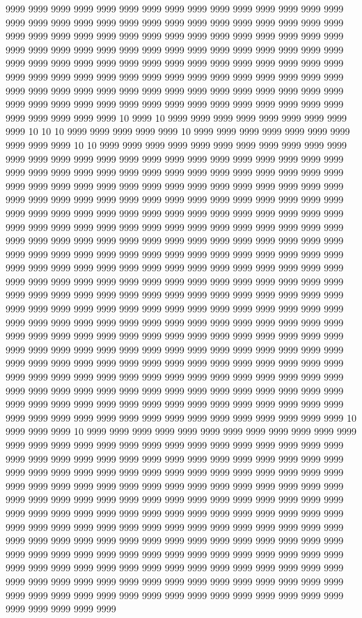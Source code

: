 9999 9999 9999 9999 9999 9999 9999 9999 9999 9999 9999 9999 9999 9999 9999 9999 9999 9999 9999 9999 9999 9999 9999 9999 9999 9999 9999 9999 9999 9999 9999 9999 9999 9999 9999 9999 9999 9999 9999 9999 9999 9999 9999 9999 9999 9999 9999 9999 9999 9999 9999 9999 9999 9999 9999 9999 9999 9999 9999 9999 9999 9999 9999 9999 9999 9999 9999 9999 9999 9999 9999 9999 9999 9999 9999 9999 9999 9999 9999 9999 9999 9999 9999 9999 9999 9999 9999 9999 9999 9999 9999 9999 9999 9999 9999 9999 9999 9999 9999 9999 9999 9999 9999 9999 9999 9999 9999 9999 9999 9999 9999 9999 9999 9999 9999 9999 9999 9999 9999 9999 9999 9999 9999 9999 9999 10 9999 10 9999 9999 9999 9999 9999 9999 9999 9999 9999 10 10 10 9999 9999 9999 9999 9999 10 9999 9999 9999 9999 9999 9999 9999 9999 9999 9999 10 10 9999 9999 9999 9999 9999 9999 9999 9999 9999 9999 9999 9999 9999 9999 9999 9999 9999 9999 9999 9999 9999 9999 9999 9999 9999 9999 9999 9999 9999 9999 9999 9999 9999 9999 9999 9999 9999 9999 9999 9999 9999 9999 9999 9999 9999 9999 9999 9999 9999 9999 9999 9999 9999 9999 9999 9999 9999 9999 9999 9999 9999 9999 9999 9999 9999 9999 9999 9999 9999 9999 9999 9999 9999 9999 9999 9999 9999 9999 9999 9999 9999 9999 9999 9999 9999 9999 9999 9999 9999 9999 9999 9999 9999 9999 9999 9999 9999 9999 9999 9999 9999 9999 9999 9999 9999 9999 9999 9999 9999 9999 9999 9999 9999 9999 9999 9999 9999 9999 9999 9999 9999 9999 9999 9999 9999 9999 9999 9999 9999 9999 9999 9999 9999 9999 9999 9999 9999 9999 9999 9999 9999 9999 9999 9999 9999 9999 9999 9999 9999 9999 9999 9999 9999 9999 9999 9999 9999 9999 9999 9999 9999 9999 9999 9999 9999 9999 9999 9999 9999 9999 9999 9999 9999 9999 9999 9999 9999 9999 9999 9999 9999 9999 9999 9999 9999 9999 9999 9999 9999 9999 9999 9999 9999 9999 9999 9999 9999 9999 9999 9999 9999 9999 9999 9999 9999 9999 9999 9999 9999 9999 9999 9999 9999 9999 9999 9999 9999 9999 9999 9999 9999 9999 9999 9999 9999 9999 9999 9999 9999 9999 9999 9999 9999 9999 9999 9999 9999 9999 9999 9999 9999 9999 9999 9999 9999 9999 9999 9999 9999 9999 9999 9999 9999 9999 9999 9999 9999 9999 9999 9999 9999 9999 9999 9999 9999 9999 9999 9999 9999 9999 9999 9999 9999 9999 9999 9999 9999 9999 9999 9999 9999 9999 9999 9999 9999 9999 9999 9999 9999 9999 9999 9999 9999 9999 9999 9999 9999 9999 9999 9999 9999 9999 9999 9999 9999 9999 9999 9999 9999 9999 9999 10 9999 9999 9999 10 9999 9999 9999 9999 9999 9999 9999 9999 9999 9999 9999 9999 9999 9999 9999 9999 9999 9999 9999 9999 9999 9999 9999 9999 9999 9999 9999 9999 9999 9999 9999 9999 9999 9999 9999 9999 9999 9999 9999 9999 9999 9999 9999 9999 9999 9999 9999 9999 9999 9999 9999 9999 9999 9999 9999 9999 9999 9999 9999 9999 9999 9999 9999 9999 9999 9999 9999 9999 9999 9999 9999 9999 9999 9999 9999 9999 9999 9999 9999 9999 9999 9999 9999 9999 9999 9999 9999 9999 9999 9999 9999 9999 9999 9999 9999 9999 9999 9999 9999 9999 9999 9999 9999 9999 9999 9999 9999 9999 9999 9999 9999 9999 9999 9999 9999 9999 9999 9999 9999 9999 9999 9999 9999 9999 9999 9999 9999 9999 9999 9999 9999 9999 9999 9999 9999 9999 9999 9999 9999 9999 9999 9999 9999 9999 9999 9999 9999 9999 9999 9999 9999 9999 9999 9999 9999 9999 9999 9999 9999 9999 9999 9999 9999 9999 9999 9999 9999 9999 9999 9999 9999 9999 9999 9999 9999 9999 9999 9999 9999 9999 9999 9999 9999 9999 9999 9999 9999 9999 9999 9999 9999 9999 9999 9999 9999 9999 9999 